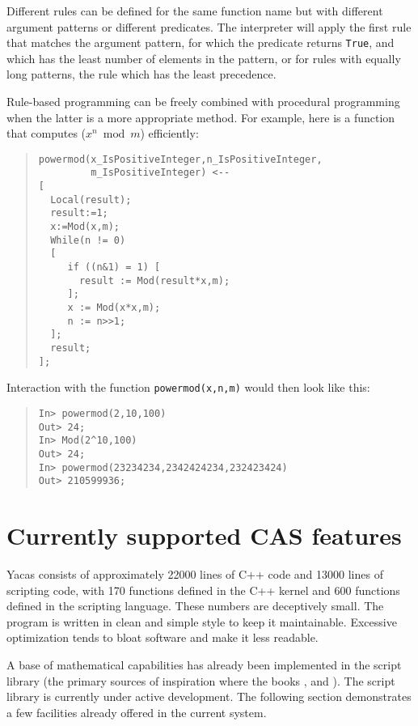 \documentclass{llncs}
\begin{document}
Different rules can be defined for the same function name but with different
argument patterns or different predicates. The interpreter will apply the first
rule that matches the argument pattern, for which the predicate returns \texttt{True},
and which has the least number of elements in the pattern, or for rules with
equally long patterns, the rule which has the least precedence.


Rule-based programming can be freely combined with procedural programming when
the latter is a more appropriate method. For example, here is a function that
computes ($x ^{n}\bmod m$) efficiently:


\begin{quote}\small\begin{verbatim}
powermod(x_IsPositiveInteger,n_IsPositiveInteger,
         m_IsPositiveInteger) <--
[
  Local(result);
  result:=1;
  x:=Mod(x,m);
  While(n != 0)
  [
     if ((n&1) = 1) [
	   result := Mod(result*x,m);
	 ];
     x := Mod(x*x,m);
     n := n>>1;
  ];
  result;
];
\end{verbatim}\end{quote}


Interaction with the function \texttt{powermod(x,n,m)} would then look like this:


\begin{quote}\small\begin{verbatim}
In> powermod(2,10,100)
Out> 24;
In> Mod(2^10,100)
Out> 24;
In> powermod(23234234,2342424234,232423424)
Out> 210599936;
\end{verbatim}\end{quote}


\section{Currently supported CAS features}
Yacas consists of approximately 22000 lines of C++ code and  13000 lines of 
scripting code, with 170 functions defined in the C++ kernel and 600 functions
defined  in the scripting language. These numbers are deceptively small. The
program is written in clean and simple style to keep it maintainable. Excessive
optimization tends to bloat software and make it less readable.


A base of mathematical capabilities has already been implemented in the script
library (the primary sources of inspiration where the books \cite{K98}, \cite{GG99} and
\cite{B86}). The script library is currently under active development.  The
following section demonstrates a few facilities already offered in the  current
system.
\end{document}
